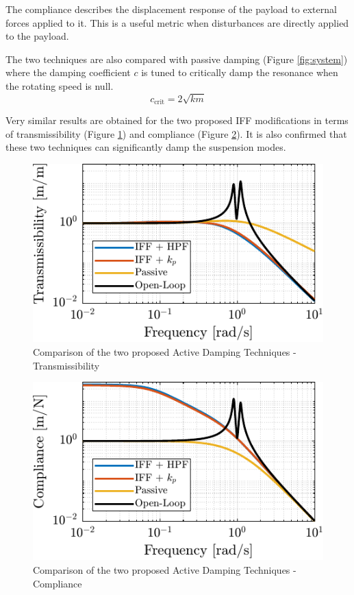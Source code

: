 \documentclass[10pt]{iopart}
\begin{document}
The compliance describes the displacement response of the payload to external forces applied to it.
This is a useful metric when disturbances are directly applied to the payload.

The two techniques are also compared with passive damping (Figure \ref{fig:system}) where the damping coefficient \(c\) is tuned to critically damp the resonance when the rotating speed is null.
\begin{equation}
  c_\text{crit} = 2 \sqrt{k m}
\end{equation}

Very similar results are obtained for the two proposed IFF modifications in terms of transmissibility (Figure \ref{fig:comp_transmissibility}) and compliance (Figure \ref{fig:comp_compliance}).
It is also confirmed that these two techniques can significantly damp the suspension modes.

\begin{figure}[htbp]
\centering
\includegraphics[scale=1]{figs/comp_transmissibility.pdf}
\caption{\label{fig:comp_transmissibility}Comparison of the two proposed Active Damping Techniques - Transmissibility}
\end{figure}


\begin{figure}[htbp]
\centering
\includegraphics[scale=1]{figs/comp_compliance.pdf}
\caption{\label{fig:comp_compliance}Comparison of the two proposed Active Damping Techniques - Compliance}
\end{figure}
\end{document}
